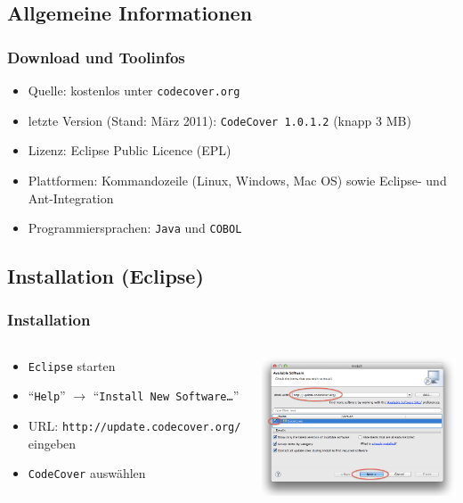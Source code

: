 \documentclass{beamer}
\begin{document}
  \subsection{Allgemeine Informationen}
  \begin{frame}\frametitle{Download und Toolinfos}
    \begin{itemize}
      \item Quelle: kostenlos unter \texttt{codecover.org}
      \item letzte Version (Stand: März 2011): \texttt{CodeCover 1.0.1.2} (knapp 3 MB)
      \item Lizenz: Eclipse Public Licence (EPL)
      \item Plattformen: Kommandozeile (Linux, Windows, Mac OS) sowie Eclipse- und Ant-Integration
      \item Programmiersprachen: \texttt{Java} und \texttt{COBOL}
    \end{itemize}
  \end{frame}

  \subsection{Installation (Eclipse)}
  \begin{frame}
    \frametitle{Installation}
    \begin{columns}
      \begin{column}{4cm}
        \begin{itemize}
          \item \texttt{Eclipse} starten
          \item ``\texttt{Help}'' $\rightarrow$ ``\texttt{Install New Software\dots}''
          \item URL: \texttt{http://update.code\-cover.org/} eingeben
          \item \texttt{CodeCover} auswählen
        \end{itemize}
        \vspace{2cm}
      \end{column}
      \begin{column}{6cm}
        \begin{overprint}
          \includegraphics[width=7cm]{pictures/install.png}
        \end{overprint}
      \end{column}
    \end{columns}
  \end{frame}
\end{document}
